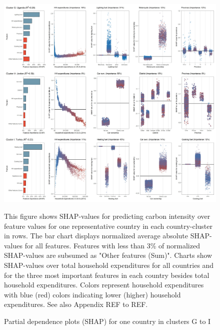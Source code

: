 \documentclass[12pt, a4paper]{article}
\newenvironment{subcaption}
{\strut
\vspace{-5pt}
\begin{minipage}[b]{0.9\textwidth}
  \hspace*{-\parindent}
  \footnotesize}
 {\end{minipage}}
\begin{document}
\begin{figure}[ht!]
    \centering
    \includegraphics[width=15.5 cm]{Figure 5/Figures_joint_3}
    \caption{Partial dependence plots (SHAP) for one country in clusters G to I}
    \label{fig:fig_5_3}
    \begin{subcaption}
    This figure shows SHAP-values for predicting carbon intensity over feature values for one representative country in each country-cluster in rows. The bar chart displays normalized average absolute SHAP-values for all features. Features with less than 3\% of normalized SHAP-values are subsumed as "Other features (Sum)". Charts show SHAP-values over total household expenditures for all countries and for the three most important features in each country besides total household expenditures. Colors represent household expenditures with blue (red) colors indicating lower (higher) household expenditures. See also Appendix REF to REF.
    \end{subcaption}
\end{figure}
\end{document}
